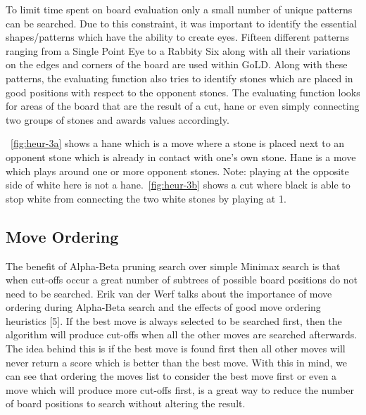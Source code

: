 \documentclass{l4proj}
\begin{document}
To limit time spent on board evaluation only a small number of unique patterns can be searched. Due to this constraint, it was important to identify the essential shapes/patterns which have the ability to create eyes. Fifteen different patterns ranging from a Single Point Eye to a Rabbity Six along with all their variations on the edges and corners of the board are used within GoLD.  Along with these patterns, the evaluating function also tries to identify stones which are placed in good positions with respect to the opponent stones. The evaluating function looks for areas of the board that are the result of a cut, hane or even simply connecting two groups of stones and awards values accordingly.



~\autoref{fig:heur-3a} shows a hane which is a move where a stone is placed next to an opponent stone which is already in contact with one’s own stone. Hane is a move which plays around one or more opponent stones. Note: playing at the opposite side of white here is not a hane.~\autoref{fig:heur-3b} shows a cut where black is able to stop white from connecting the two white stones by playing at 1.






\subsection{Move Ordering}
The benefit of Alpha-Beta pruning search over simple Minimax search is that when cut-offs occur a great number of subtrees of possible board positions do not need to be searched. Erik van der Werf talks about the importance of move ordering during Alpha-Beta search and the effects of good move ordering heuristics [5]. If the best move is always selected to be searched first, then the algorithm will produce cut-offs when all the other moves are searched afterwards. The idea behind this is if the best move is found first then all other moves will never return a score which is better than the best move. With this in mind, we can see that ordering the moves list to consider the best move first or even a move which will produce more cut-offs first, is a great way to reduce the number of board positions to search without altering the result.
\end{document}
